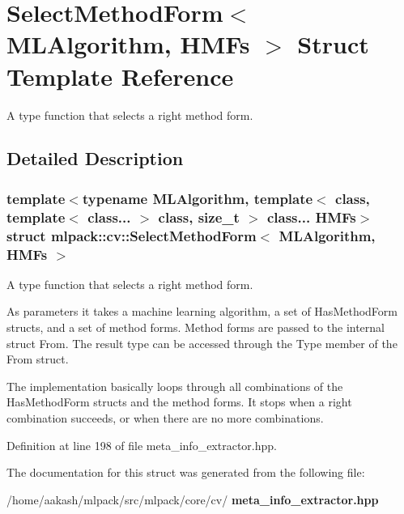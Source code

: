 \section{Select\+Method\+Form$<$ M\+L\+Algorithm, H\+M\+Fs $>$ Struct Template Reference}
\label{structmlpack_1_1cv_1_1SelectMethodForm}


A type function that selects a right method form.  




\subsection{Detailed Description}
\subsubsection*{template$<$typename M\+L\+Algorithm, template$<$ class, template$<$ class... $>$ class, size\+\_\+t $>$ class... H\+M\+Fs$>$\newline
struct mlpack\+::cv\+::\+Select\+Method\+Form$<$ M\+L\+Algorithm, H\+M\+Fs $>$}

A type function that selects a right method form. 

As parameters it takes a machine learning algorithm, a set of Has\+Method\+Form structs, and a set of method forms. Method forms are passed to the internal struct From. The result type can be accessed through the Type member of the From struct.

The implementation basically loops through all combinations of the Has\+Method\+Form structs and the method forms. It stops when a right combination succeeds, or when there are no more combinations. 

Definition at line 198 of file meta\+\_\+info\+\_\+extractor.\+hpp.



The documentation for this struct was generated from the following file\+:\begin{DoxyCompactItemize}
\item 
/home/aakash/mlpack/src/mlpack/core/cv/\textbf{ meta\+\_\+info\+\_\+extractor.\+hpp}\end{DoxyCompactItemize}
